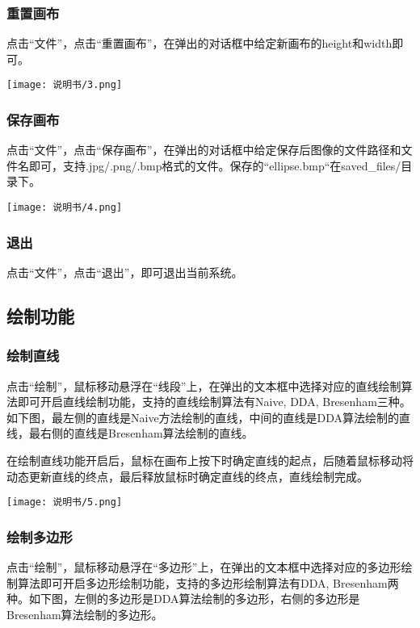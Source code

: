 \documentclass[a4paper,UTF8]{article}
\theoremstyle{definition}
\begin{document}
		\subsubsection{重置画布}
		点击“文件”，点击“重置画布”，在弹出的对话框中给定新画布的height和width即可。
		\begin{center}
			\texttt{[image: 说明书/3.png]}
		\end{center}
	
		\subsubsection{保存画布}
		点击“文件”，点击“保存画布”，在弹出的对话框中给定保存后图像的文件路径和文件名即可，支持.jpg/.png/.bmp格式的文件。保存的“ellipse.bmp“在saved\_files/目录下。
		\begin{center}
			\texttt{[image: 说明书/4.png]}
		\end{center}
	
		\subsubsection{退出}
		点击“文件”，点击“退出”，即可退出当前系统。
		
		\subsection{绘制功能}
		\subsubsection{绘制直线}
		点击“绘制”，鼠标移动悬浮在“线段”上，在弹出的文本框中选择对应的直线绘制算法即可开启直线绘制功能，支持的直线绘制算法有Naive, DDA, Bresenham三种。如下图，最左侧的直线是Naive方法绘制的直线，中间的直线是DDA算法绘制的直线，最右侧的直线是Bresenham算法绘制的直线。
		
		在绘制直线功能开启后，鼠标在画布上按下时确定直线的起点，后随着鼠标移动将动态更新直线的终点，最后释放鼠标时确定直线的终点，直线绘制完成。
		\begin{center}
			\texttt{[image: 说明书/5.png]}
		\end{center}
		
		\subsubsection{绘制多边形}
		点击“绘制”，鼠标移动悬浮在“多边形”上，在弹出的文本框中选择对应的多边形绘制算法即可开启多边形绘制功能，支持的多边形绘制算法有DDA, Bresenham两种。如下图，左侧的多边形是DDA算法绘制的多边形，右侧的多边形是Bresenham算法绘制的多边形。
		
\end{document}
